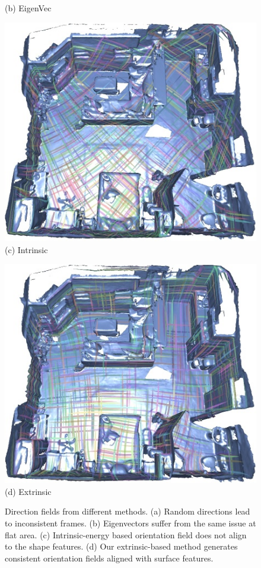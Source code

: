 \begin{figure}
\begin{minipage}{0.24\linewidth}
    (b) EigenVec
    \end{minipage}
    \begin{minipage}{0.24\linewidth}
    \centering
    \includegraphics[width=\linewidth]{texturenet/field/intrinsic.jpg}
    (c) Intrinsic
    \end{minipage}
    \begin{minipage}{0.24\linewidth}
    \centering
    \includegraphics[width=\linewidth]{texturenet/field/extrinsic.jpg}
    (d) Extrinsic
    \end{minipage}
    \caption{Direction fields from different methods. (a) Random directions lead to inconsistent frames. (b) Eigenvectors suffer from the same issue at flat area. (c) Intrinsic-energy based orientation field does not align to the shape features. (d) Our extrinsic-based method generates consistent orientation fields aligned with surface features.}
    \label{fig:texturenet-coordinate}
\end{figure}

